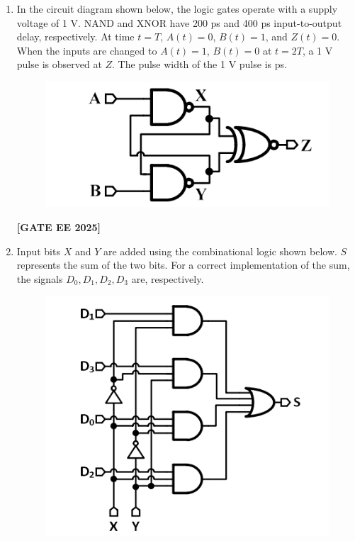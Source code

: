 \documentclass[journal]{IEEEtran}
\newcommand{\qfooter}{%
  \begin{flushright}\footnotesize\textbf{[GATE EE 2025]}\end{flushright}\vspace{1em}%
}
\begin{document}
\begin{enumerate}
\item In the circuit diagram shown below, the logic gates operate with a supply voltage of 1 V. NAND and XNOR have 200 ps and 400 ps input-to-output delay, respectively.  
At time \(t = T\), \(A(t) = 0\), \(B(t) = 1\), and \(Z(t) = 0\). When the inputs are changed to \(A(t) = 1\), \(B(t) = 0\) at \(t = 2T\), a 1 V pulse is observed at \(Z\). The pulse width of the 1 V pulse is \underline{\hspace{2cm}} ps.

\begin{figure}[H]
\centering
\includegraphics[width=0.5\columnwidth]{figs/q16.png}
\end{figure}

\begin{enumerate}
\end{enumerate}
\qfooter

\item Input bits \(X\) and \(Y\) are added using the combinational logic shown below. \(S\) represents the sum of the two bits. For a correct implementation of the sum, the signals \(D_0, D_1, D_2, D_3\) are\underline{\hspace{2cm}}, respectively.

\begin{figure}[H]
\centering
 \includegraphics[width=0.5\columnwidth]{figs/q17.png}
\end{figure}


\end{enumerate}
\end{document}
